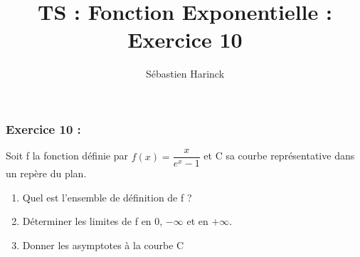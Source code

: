 \documentclass[t]{beamer}
\title{TS : Fonction Exponentielle : Exercice 10}
\author{Sébastien Harinck}
\institute{www.cours-futes.com}
\date{}
\begin{document}
\begin{frame}
\titlepage
\end{frame}

\begin{frame}
\frametitle{Exercice 10 :}
\pause
Soit f la fonction définie par $ f(x) = \dfrac{x}{e^x-1} $ et C sa courbe représentative dans un repère du plan. \\
\pause
\begin{enumerate}
\item<+-> Quel est l'ensemble de définition de f ?
\item<+-> Déterminer les limites de f en 0, $ - \infty $ et en $ + \infty $.
\item<+-> Donner les asymptotes à la courbe C
\end{enumerate}
\end{frame}
\end{document}
